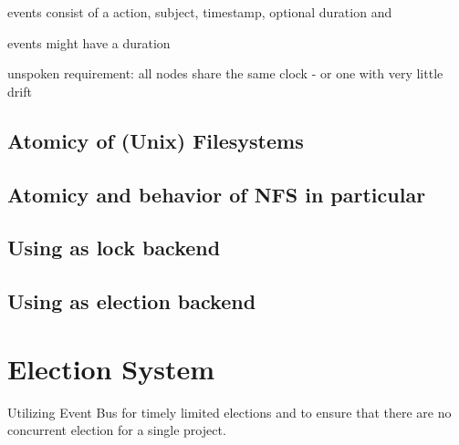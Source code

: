 events consist of a action, subject, timestamp, optional duration and 

events might have a duration

unspoken requirement: all nodes share the same clock - or one with very little drift

\subsection{Atomicy of (Unix) Filesystems}

\subsection{Atomicy and behavior of NFS in particular}

\subsection{Using as lock backend}

\subsection{Using as election backend}



\section{Election System}

Utilizing Event Bus for timely limited elections and to ensure that there are no concurrent election for a single project.

